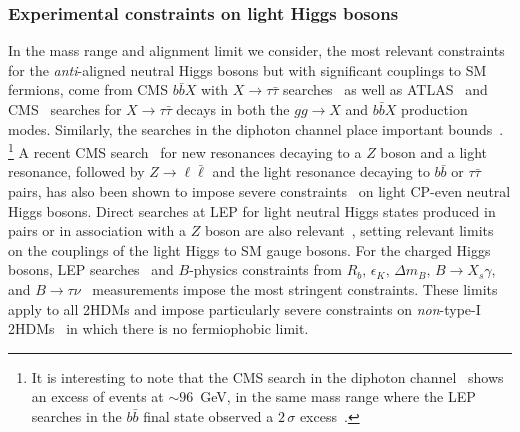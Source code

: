 \documentclass[../report.tex]{subfiles}
\begin{document}
\subsubsection{Experimental constraints on light Higgs bosons}\label{sec:limits}

In the mass range and alignment limit we consider, the most relevant
constraints for the \emph{anti}-aligned neutral Higgs bosons but with
significant couplings to SM fermions, come from CMS $b\bar{b}X$ with $X
\to \tau\bar{\tau}$ searches~\cite{Khachatryan:2015baw} as well as
ATLAS~\cite{Aad:2014vgg} and CMS~\cite{Khachatryan:2014wca} searches for
$X \to \tau\bar{\tau}$ decays in both the $gg \to X$ and $b\bar{b}X$
production modes. Similarly, the searches in the diphoton channel
  place important bounds~\cite{CMS-PAS-HIG-17-013,ATLAS-CONF-2018-025}.%
\footnote{It is interesting to note that the CMS search in the diphoton
  channel~\cite{CMS-PAS-HIG-17-013} shows an excess of events at $\sim
  96$~GeV, in the same mass range where the LEP searches in the 
  $b \bar b$ final state observed a $2\,\sigma$ excess~\cite{Schael:2006cr}.}
A recent CMS search~\cite{CMS:2015mba} for new
resonances decaying to a $Z$ boson and a light resonance, followed by 
$Z \to \ell\bar\ell$ and the light resonance decaying to $b\bar{b}$ or
$\tau\bar{\tau}$ pairs, has also been shown to impose severe
constraints~\cite{Bernon:2015wef} on light CP-even neutral Higgs
bosons. Direct searches at LEP for light neutral Higgs states produced
in pairs or in association with a $Z$ boson are also
relevant~\cite{Barate:2003sz,Abbiendi:2004gn,Schael:2006cr},
setting relevant limits on the couplings of the light Higgs to SM
gauge bosons. For
the charged Higgs bosons, LEP searches~\cite{Abbiendi:2013hk} and
$B$-physics constraints from $R_b,\,\epsilon_K,\,\Delta m_B,\,B\to
X_s\gamma$, and
$B\to\tau\nu$~\cite{Haisch:2008ar,Mahmoudi:2009zx,Gupta:2009wn,Jung:2010ik,Misiak:2015xwa}
measurements impose the most stringent constraints. These limits apply
to all 2HDMs and impose particularly severe constraints on
\emph{non}-type-I 2HDMs~\cite{Bernon:2015wef} in which there is no
fermiophobic limit.  
\end{document}
